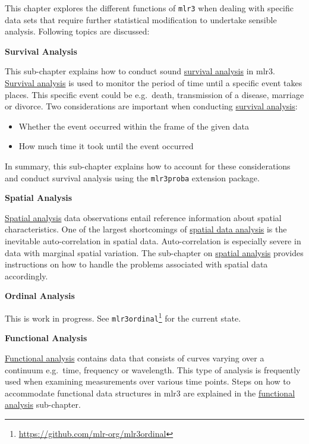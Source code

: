 \documentclass[12pt,]{scrbook}
\providecommand{\tightlist}{%
  \setlength{\itemsep}{0pt}\setlength{\parskip}{0pt}}
\renewcommand{\href}[2]{#2\footnote{\url{#1}}}
\begin{document}
This chapter explores the different functions of \texttt{mlr3} when dealing with specific data sets that require further statistical modification to undertake sensible analysis.
Following topics are discussed:

\textbf{Survival Analysis}

This sub-chapter explains how to conduct sound \protect\hyperlink{survival}{survival analysis} in mlr3.
\protect\hyperlink{survival}{Survival analysis} is used to monitor the period of time until a specific event takes places.
This specific event could be e.g.~death, transmission of a disease, marriage or divorce.
Two considerations are important when conducting \protect\hyperlink{survival}{survival analysis}:

\begin{itemize}
\tightlist
\item
  Whether the event occurred within the frame of the given data
\item
  How much time it took until the event occurred
\end{itemize}

In summary, this sub-chapter explains how to account for these considerations and conduct survival analysis using the \texttt{mlr3proba} extension package.

\textbf{Spatial Analysis}

\protect\hyperlink{spatial}{Spatial analysis} data observations entail reference information about spatial characteristics.
One of the largest shortcomings of \protect\hyperlink{spatial}{spatial data analysis} is the inevitable auto-correlation in spatial data.
Auto-correlation is especially severe in data with marginal spatial variation.
The sub-chapter on \protect\hyperlink{spatial}{spatial analysis} provides instructions on how to handle the problems associated with spatial data accordingly.

\textbf{Ordinal Analysis}

This is work in progress.
See \href{https://github.com/mlr-org/mlr3ordinal}{\texttt{mlr3ordinal}} for the current state.

\textbf{Functional Analysis}

\protect\hyperlink{functional}{Functional analysis} contains data that consists of curves varying over a continuum e.g.~time, frequency or wavelength.
This type of analysis is frequently used when examining measurements over various time points.
Steps on how to accommodate functional data structures in mlr3 are explained in the \protect\hyperlink{functional}{functional analysis} sub-chapter.
\end{document}
